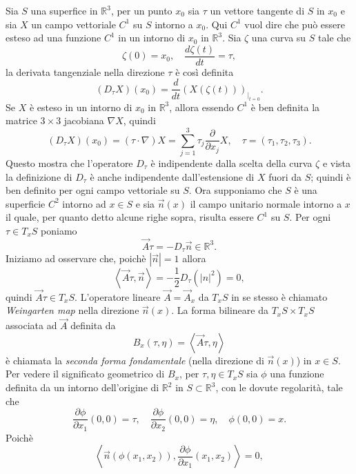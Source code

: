 Sia $S$ una superfice in $\mathbb{R}^3$, per un punto $x_0$ sia $\tau$ un vettore tangente di $S$ in $x_0$ e sia $X$ un campo vettoriale $C^1$ su $S$ intorno a $x_0$. Qui $C^1$ vuol dire che può essere esteso ad una funzione $C^1$ in un intorno di $x_0$ in $\mathbb{R}^3$. Sia $\zeta$ una curva su $S$ tale che
\[
\zeta(0)=x_0,\quad\frac{d\zeta(t)}{dt}=\tau,
\]
la derivata tangenziale nella direzione $\tau$ è così definita
\[
(D_{\tau}X)(x_0)=\frac{d}{dt}\left(X(\zeta(t))\right)_{|_{t=0}}.
\]
Se $X$ è esteso in un intorno di $x_0$ in $\mathbb{R}^3$, allora essendo $C^1$ è ben definita la matrice $3\times 3$ jacobiana $\nabla X$, quindi
\begin{equation}
\label{eq:cp1-1-01}
(D_{\tau}X)(x_0)=(\tau\cdot\nabla)X=\sum_{j=1}^3\tau_j\frac{\partial}{\partial x_j}X,\quad\tau=(\tau_1,\tau_2,\tau_3).
\end{equation}
Questo mostra che l'operatore $D_{\tau}$ è indipendente dalla scelta della curva $\zeta$ e vista la definizione di $D_{\tau}$ è anche indipendente dall'estensione di $X$ fuori da $S$; quindi è ben definito per ogni campo vettoriale su $S$.
Ora supponiamo che $S$ è una superficie $C^2$ intorno ad $x\in S$ e sia $\vec{n}(x)$ il campo unitario normale intorno a $x$ il quale, per quanto detto alcune righe sopra, risulta essere $C^1$ su $S$. Per ogni $\tau\in T_xS$ poniamo
\begin{equation}
\label{eq:cp1-1-02}
\vec{A}\tau=-D_{\tau}\vec{n}\in\mathbb{R}^3.
\end{equation}
Iniziamo ad osservare che, poichè $|\vec{n}|=1$ allora
\[
\left<\vec{A}\tau,\vec{n}\right>=-\frac{1}{2}D_{\tau}(|n|^2)=0,
\]
quindi $\vec{A}\tau\in T_xS$. L'operatore lineare $\vec{A}=\vec{A}_x$ da $T_xS$ in se stesso è chiamato \emph{Weingarten map} nella direzione $\vec{n}(x)$. La forma bilineare da $T_xS\times T_xS$ associata ad $\vec{A}$ definita da
\begin{equation}
\label{eq:cp1-1-03}
B_x(\tau,\eta)=\left<\vec{A}\tau,\eta\right>
\end{equation}
è chiamata la \emph{seconda forma fondamentale} (nella direzione di
$\vec{n}(x)$) in $x\in S$. Per vedere il significato geometrico di
$B_x$, per $\tau,\eta\in  T_xS$ sia $\phi$ una funzione  definita da
un intorno dell'origine di $\mathbb{R}^2$ in $S\subset\mathbb{R}^3$,
con le dovute regolarità, tale che
\[
\frac{\partial\phi}{\partial x_1}(0,0)=\tau,\quad\frac{\partial\phi}{\partial x_2}(0,0)=\eta,\quad\phi(0,0)=x.
\]
Poichè
\begin{equation}
\label{eq:cp1-1-04}
\left<\vec{n}(\phi(x_1,x_2)),\frac{\partial\phi}{\partial x_1}(x_1,x_2)\right>=0,
\end{equation}
